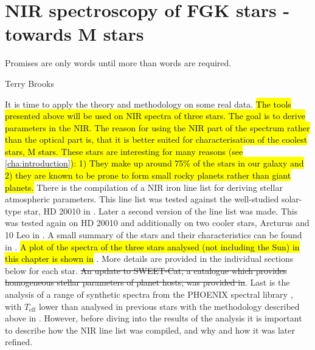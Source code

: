 
\chapter{NIR spectroscopy of FGK stars - towards M stars}
\label{cha:results}
\epigraph{Promises are only words until more than words are required.}{Terry Brooks}

It is time to apply the theory and methodology on some real data. \hl{The tools presented above
will be used on NIR spectra of three stars. The goal is to derive parameters in the NIR. The reason
for using the NIR part of the spectrum rather than the optical part is, that it is better suited for
characterisation of the coolest stars, M stars. These stars are interesting for many reasons (see}
\cref{cha:introduction}\hl{): 1) They make up around 75\% of the stars in our galaxy and 2) they are
known to be prone to form small rocky planets rather than giant planets.} There is the compilation
of a NIR iron line list for deriving stellar atmospheric parameters. This line list was tested
against the well-studied solar-type star, HD 20010 in \citet{Andreasen2016}. Later a second version
of the line list was made. This was tested again on HD 20010 and additionally on two cooler stars,
Arcturus and 10 Leo in \citet{Andreasen2017b}. A small summary of the stars and their
characteristics can be found in . \hl{A plot of the spectra of the three stars
analysed (not including the Sun) in this chapter is shown in} . More details
are provided in the individual sections below for each star. \st{An update to SWEET-Cat, a catalogue
which provides homogeneous stellar parameters of planet hosts, was provided in}. Last is the
analysis of a range of synthetic spectra from the PHOENIX spectral library \citep{Husser2013}, with
$T_\mathrm{eff}$ lower than analysed in previous stars with the methodology described above in
. However, before diving into the results of the analysis it is important to
describe how the NIR line list was compiled, and why and how it was later refined.

